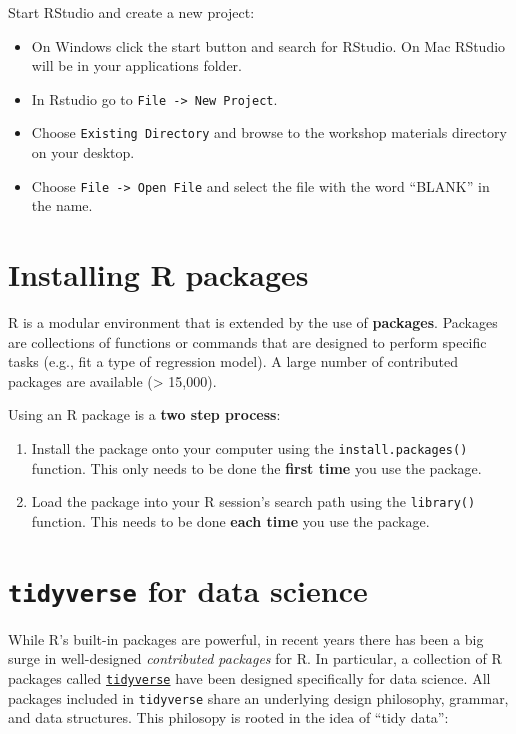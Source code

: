 \documentclass[]{book}
\providecommand{\tightlist}{%
  \setlength{\itemsep}{0pt}\setlength{\parskip}{0pt}}
\begin{document}
Start RStudio and create a new project:

\begin{itemize}
\tightlist
\item
  On Windows click the start button and search for RStudio. On Mac
  RStudio will be in your applications folder.
\item
  In Rstudio go to \texttt{File\ -\textgreater{}\ New\ Project}.
\item
  Choose \texttt{Existing\ Directory} and browse to the workshop materials directory on your desktop.
\item
  Choose \texttt{File\ -\textgreater{}\ Open\ File} and select the file with the word ``BLANK'' in the name.
\end{itemize}

\hypertarget{installing-r-packages}{%
\section{Installing R packages}\label{installing-r-packages}}

R is a modular environment that is extended by the use of \textbf{packages}.
Packages are collections of functions or commands that are designed to
perform specific tasks (e.g., fit a type of regression model). A large
number of contributed packages are available (\textgreater{} 15,000).

Using an R package is a \textbf{two step process}:

\begin{enumerate}
\def\labelenumi{\arabic{enumi}.}
\item
  Install the package onto your computer using the
  \texttt{install.packages()} function. This only needs to
  be done the \textbf{first time} you use the package.
\item
  Load the package into your R session's search path
  using the \texttt{library()} function. This needs to be done
  \textbf{each time} you use the package.
\end{enumerate}

\hypertarget{tidyverse-for-data-science}{%
\section{\texorpdfstring{\texttt{tidyverse} for data science}{tidyverse for data science}}\label{tidyverse-for-data-science}}

While R's built-in packages are powerful, in recent years there has
been a big surge in well-designed \emph{contributed packages} for R. In
particular, a collection of R packages called
\href{https://www.tidyverse.org/}{\texttt{tidyverse}} have been
designed specifically for data science. All packages included in
\texttt{tidyverse} share an underlying design philosophy, grammar, and
data structures. This philosopy is rooted in the idea of ``tidy data'':
\end{document}
